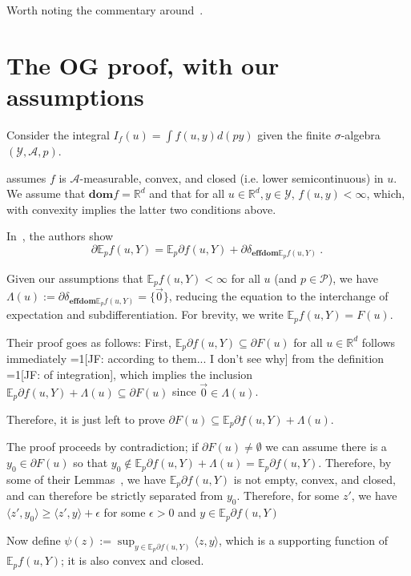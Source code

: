 \documentclass[12pt]{article}
\newcommand{\Comments}{1}
\newcommand{\mynote}[2]{\ifnum\Comments=1\textcolor{#1}{#2}\fi}
\newcommand{\jessie}[1]{\mynote{green!75!black}{[JF: #1]}}
\newcommand{\reals}{\mathbb{R}}
\newcommand{\A}{\mathcal{A}}
\newcommand{\E}{\mathbb{E}}
\renewcommand{\P}{\mathcal{P}}
\newcommand{\Y}{\mathcal{Y}}
\newcommand{\dom}{\mathbf{dom}}
\newcommand{\effdom}{\mathbf{effdom}}
\begin{document}
Worth noting the commentary around~\cite[Equation 7]{ioffe1969minimization}.


\section{The OG proof, with our assumptions}
Consider the integral $I_f(u) = \int f(u,y) d(py)$ given the finite $\sigma$-algebra $(\Y, \A, p)$.

\cite{ioffe1969minimization} assumes $f$ is $\A$-measurable, convex, and closed (i.e. lower semicontinuous) in $u$.
We assume that $\dom f = \reals^d$ and that for all $u \in \reals^d,y \in \Y$, $f(u,y) < \infty$, which, with convexity implies the latter two conditions above.

In~\cite[Equation 7]{ioffe1969minimization}, the authors show 
\begin{equation}
\partial \E_p f(u,Y) = \E_p \partial f(u,Y) + \partial \delta_{\effdom \E_p f(u,Y)}~.~
\end{equation}

Given our assumptions that $\E_p f(u,Y) < \infty$ for all $u$ (and $p \in \P$), we have $\Lambda(u) := \partial \delta_{\effdom \E_p f(u,Y)} = \{\vec 0\}$, reducing the equation to the interchange of expectation and subdifferentiation.
For brevity, we write $\E_p f(u,Y) = F(u)$.

Their proof goes as follows:
First, $\E_p \partial f(u,Y) \subseteq \partial F(u)$ for all $u \in \reals^d$ follows immediately \jessie{according to them... I don't see why} from the definition \jessie{of integration}, which implies the inclusion $\E_p \partial f(u,Y) + \Lambda(u) \subseteq \partial F(u)$ since $\vec 0 \in \Lambda(u)$.

Therefore, it is just left to prove $\partial F(u) \subseteq \E_p \partial f(u,Y) + \Lambda(u)$.

The proof proceeds by contradiction; if $\partial F(u) \neq \emptyset$ we can assume there is a $y_0 \in \partial F(u)$ so that $y_0 \not \in \E_p \partial f(u,Y) + \Lambda(u) = \E_p \partial f(u,Y)$.
Therefore, by some of their Lemmas~\cite[Lemmas 1, 2]{ioffe1969minimization}, we have $\E_p \partial f(u,Y)$ is not empty, convex, and closed, and can therefore be strictly separated from $y_0$.
Therefore, for some $z'$, we have $\langle z', y_0 \rangle \geq \langle z', y \rangle + \epsilon$ for some $\epsilon > 0$ and $y \in \E_p \partial f(u,Y)$

Now define $\psi(z) := \sup_{y \in \E_p \partial f(u,Y)} \langle z,y \rangle$, which is a supporting function of $\E_p f(u,Y)$; it is also convex and closed.
\end{document}
